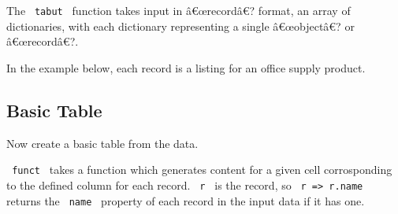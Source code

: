 The \texttt{\ tabut\ } function takes input in â€œrecordâ€? format, an
array of dictionaries, with each dictionary representing a single
â€œobjectâ€? or â€œrecordâ€?.

In the example below, each record is a listing for an office supply
product.

\begin{Shaded}
\begin{Highlighting}[]
\NormalTok{)}
\end{Highlighting}
\end{Shaded}

\subsection[Basic Table ]{\texorpdfstring{Basic Table
\protect\hypertarget{basic-table}{}{
}}{Basic Table  }}\label{basic-table}

Now create a basic table from the data.

\begin{Shaded}
\begin{Highlighting}[]

\NormalTok{    (}
\NormalTok{    ), }
\NormalTok{  )}
\NormalTok{)}
\end{Highlighting}
\end{Shaded}

\pandocbounded{}

\texttt{\ funct\ } takes a function which generates content for a given
cell corrosponding to the defined column for each record. \texttt{\ r\ }
is the record, so \texttt{\ r\ =\textgreater{}\ r.name\ } returns the
\texttt{\ name\ } property of each record in the input data if it has
one.

